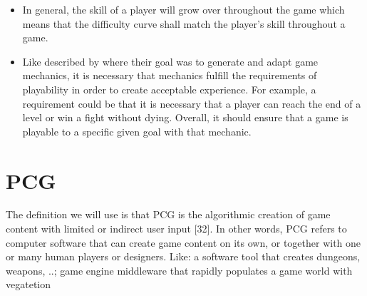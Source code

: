 \documentclass[MGS,Master,english]{twbook}%
\begin{document}
\begin{itemize}
	\item In general, the skill of a player will grow over throughout the game which means that the difficulty curve shall match the player's skill throughout a game. \cite{mechanic::gamasutra::DanielDoan}
	\item Like described by \cite{mechanic::generateAndAdaptingMechanics} where their goal was to generate and adapt game mechanics, it is necessary that mechanics fulfill the requirements of playability in order to create acceptable experience. For example, a requirement could be that it is necessary that a player can reach the end of a level or win a fight without dying. Overall, it should ensure that a game is playable to a specific given goal with that mechanic.
\end{itemize} 


%
%
\clearpage
\chapter{\acl{PCG}}

The definition we will use is that PCG is the algorithmic creation of game content with limited or indirect user input [32]. In other words, PCG refers to computer software that can create game content on its own, or together with one or many human players or designers. \cite{pcg::whatIsPCG}
Like: a software tool that creates dungeons, weapons, ..; game engine middleware that rapidly populates a game world with vegatetion
\end{document}
